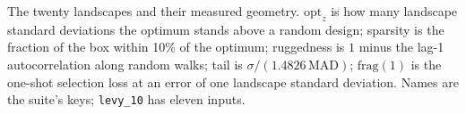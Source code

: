 \begin{table}[htbp]
\centering
\small
\caption{The twenty landscapes and their measured geometry. $\mathrm{opt}_z$ is
how many landscape standard deviations the optimum stands above a random design;
sparsity is the fraction of the box within 10\% of the optimum; ruggedness is
$1$ minus the lag-1 autocorrelation along random walks; tail is
$\sigma/(1.4826\,\mathrm{MAD})$; $\mathrm{frag}(1)$ is the one-shot selection
loss at an error of one landscape standard deviation. Names are the suite's
keys; \texttt{levy\_10} has eleven inputs.}
\label{tab:benchmarks}

\end{table}
